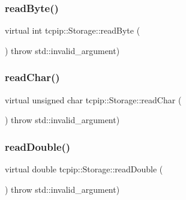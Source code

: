 \subsubsection{\texorpdfstring{read\+Byte()}{readByte()}}
{\footnotesize\ttfamily virtual int tcpip\+::\+Storage\+::read\+Byte (\begin{DoxyParamCaption}{ }\end{DoxyParamCaption}) throw  std\+::invalid\+\_\+argument) \hspace{0.3cm}{\ttfamily [virtual]}}

\mbox{\label{classtcpip_1_1_storage_a9ce771084ea76f4ee0cdc277bd340729}} 
\subsubsection{\texorpdfstring{read\+Char()}{readChar()}}
{\footnotesize\ttfamily virtual unsigned char tcpip\+::\+Storage\+::read\+Char (\begin{DoxyParamCaption}{ }\end{DoxyParamCaption}) throw  std\+::invalid\+\_\+argument) \hspace{0.3cm}{\ttfamily [virtual]}}

\mbox{\label{classtcpip_1_1_storage_a95d74d22486febfd54070910957f15e2}} 
\subsubsection{\texorpdfstring{read\+Double()}{readDouble()}}
{\footnotesize\ttfamily virtual double tcpip\+::\+Storage\+::read\+Double (\begin{DoxyParamCaption}{ }\end{DoxyParamCaption}) throw  std\+::invalid\+\_\+argument) \hspace{0.3cm}{\ttfamily [virtual]}}

\mbox{\label{classtcpip_1_1_storage_aadec452f61b7c9a8996f3b5af6f5b0ce}} 
